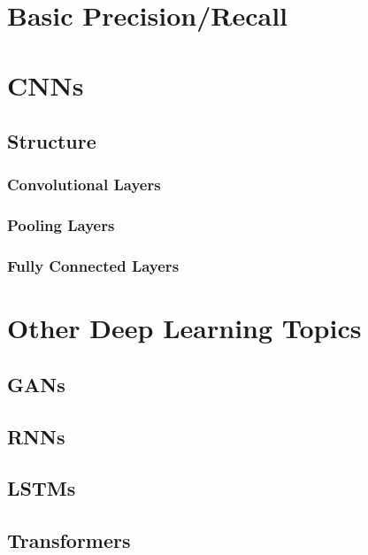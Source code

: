 \documentclass[10pt]{report}
\begin{document}
\chapter{Basic Precision/Recall}

\chapter{CNNs}
\section{Structure}
\subsection{Convolutional Layers}
\subsection{Pooling Layers}
\subsection{Fully Connected Layers}

\chapter{Other Deep Learning Topics}
\section{GANs}
\section{RNNs}
\section{LSTMs}
\section{Transformers}
\end{document}
